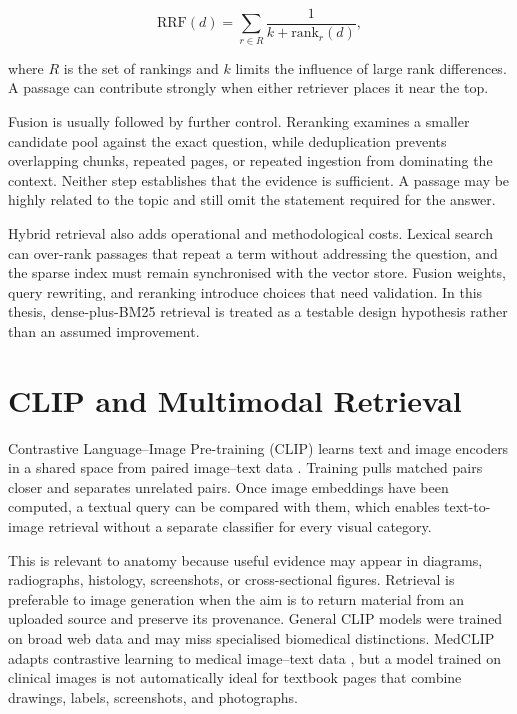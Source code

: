 \begin{equation}
\mathrm{RRF}(d)=\sum_{r\in R}\frac{1}{k+\mathrm{rank}_{r}(d)},
\label{eq:rrf}
\end{equation}

where $R$ is the set of rankings and $k$ limits the influence of large rank differences. A passage can contribute strongly when either retriever places it near the top.

Fusion is usually followed by further control. Reranking examines a smaller candidate pool against the exact question, while deduplication prevents overlapping chunks, repeated pages, or repeated ingestion from dominating the context. Neither step establishes that the evidence is sufficient. A passage may be highly related to the topic and still omit the statement required for the answer.

Hybrid retrieval also adds operational and methodological costs. Lexical search can over-rank passages that repeat a term without addressing the question, and the sparse index must remain synchronised with the vector store. Fusion weights, query rewriting, and reranking introduce choices that need validation. In this thesis, dense-plus-BM25 retrieval is treated as a testable design hypothesis rather than an assumed improvement.

\section{CLIP and Multimodal Retrieval}
\label{sec:clip-multimodal}

Contrastive Language--Image Pre-training (CLIP) learns text and image encoders in a shared space from paired image--text data \parencite{radford2021}. Training pulls matched pairs closer and separates unrelated pairs. Once image embeddings have been computed, a textual query can be compared with them, which enables text-to-image retrieval without a separate classifier for every visual category.

This is relevant to anatomy because useful evidence may appear in diagrams, radiographs, histology, screenshots, or cross-sectional figures. Retrieval is preferable to image generation when the aim is to return material from an uploaded source and preserve its provenance. General CLIP models were trained on broad web data and may miss specialised biomedical distinctions. MedCLIP adapts contrastive learning to medical image--text data \parencite{wang2022medclip}, but a model trained on clinical images is not automatically ideal for textbook pages that combine drawings, labels, screenshots, and photographs.

